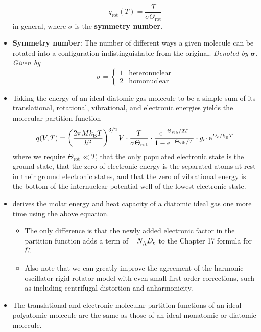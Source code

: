 \documentclass[../notes.tex]{subfiles}
\begin{document}
\begin{itemize}
    \begin{equation*}
        q_\text{rot}(T) = \frac{T}{\sigma\Theta_\text{rot}}
    \end{equation*}
    in general, where $\sigma$ is the \textbf{symmetry number}.
    \item \textbf{Symmetry number}: The number of different ways a given molecule can be rotated into a configuration indistinguishable from the original. \emph{Denoted by} $\bm{\sigma}$. \emph{Given by}
    \begin{equation*}
        \sigma =
        \begin{cases}
            1 & \text{heteronuclear}\\
            2 & \text{homonuclear}
        \end{cases}
    \end{equation*}
    \item Taking the energy of an ideal diatomic gas molecule to be a simple sum of its translational, rotational, vibrational, and electronic energies yields the molecular partition function
    \begin{equation*}
        q(V,T) = \left( \frac{2\pi M\kB T}{h^2} \right)^{3/2}V\cdot\frac{T}{\sigma\Theta_\text{rot}}\cdot\frac{\e[-\Theta_\text{vib}/2T]}{1-\e[-\Theta_\text{vib}/T]}\cdot g_{e1}\e[D_e/\kB T]
    \end{equation*}
    where we require $\Theta_\text{rot}\ll T$, that the only populated electronic state is the ground state, that the zero of electronic energy is the separated atoms at rest in their ground electronic states, and that the zero of vibrational energy is the bottom of the internuclear potential well of the lowest electronic state.
    \item \textcite{bib:McQuarrieSimon} derives the molar energy and heat capacity of a diatomic ideal gas one more time using the above equation.
    \begin{itemize}
        \item The only difference is that the newly added electronic factor in the partition function adds a term of $-\NA D_e$ to the Chapter 17 formula for $\overline{U}$.
        \item Also note that we can greatly improve the agreement of the harmonic oscillator-rigid rotator model with even small first-order corrections, such as including centrifugal distortion and anharmonicity.
    \end{itemize}
    \item The translational and electronic molecular partition functions of an ideal polyatomic molecule are the same as those of an ideal monatomic or diatomic molecule.

\end{itemize}
\end{document}
